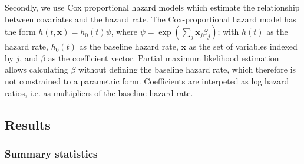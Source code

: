 \documentclass[12pt]{article}
\begin{document}
Secondly, we use Cox proportional hazard models which estimate the relationship between covariates and the hazard rate.
The Cox-proportional hazard model has the form \(h(t,\mathbf{x}) = h_0(t) \psi\), where \(\psi = \exp(\sum_{j} \mathbf{x}_j \beta_j)\); with \(h(t)\) as the hazard rate, \(h_0(t)\) as the baseline hazard rate, \(\mathbf{x}\) as the set of variables indexed by \(j\), and \(\beta\) as the coefficient vector.
Partial maximum likelihood estimation allows calculating \(\beta\) without defining the baseline hazard rate, which therefore is not constrained to a parametric form. 
Coefficients are interpeted as log hazard ratios, i.e. as multipliers of the baseline hazard rate. 



\subsection*{Results}


\subsubsection*{Summary statistics}
\end{document}
